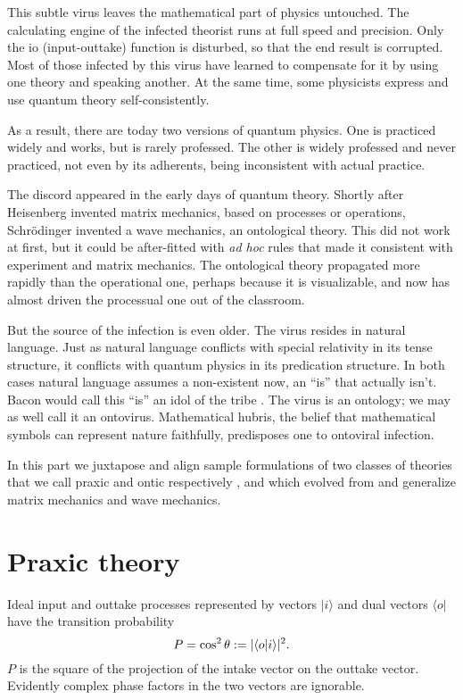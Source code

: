 \documentclass[a4paper,11pt]{article}
\begin{document}
This subtle virus 
leaves the mathematical part of  physics
untouched. 
The calculating engine of the infected theorist 
runs at full speed and precision.
Only the io (input-outtake) function is 
disturbed,
so that the end result is corrupted.
Most of those infected by this virus
have learned to compensate for it
by 
using one theory and 
speaking another.
At the same time,
some physicists 
express and use quantum theory 
self-consistently.

As a result, there are today two 
versions of quantum physics.
One is practiced widely and works,  but  is rarely professed.
The other is widely professed and never practiced,
not even by its adherents,
being inconsistent with actual practice.

The discord appeared in the early days of quantum theory.
Shortly after Heisenberg invented matrix mechanics,
based on 
processes or operations,
Schr\"odinger invented a wave mechanics,
an ontological theory.
This did not work at first, 
but it could be after-fitted
with {\em ad hoc}  rules 
that made it consistent with 
experiment and matrix mechanics.
The ontological theory
propagated more rapidly than the operational one,
perhaps because it is visualizable,
and now  has almost driven the processual 
one out of the classroom.

But the source of the infection is even older.
The virus resides in natural language.
Just as natural language conflicts with special relativity in its tense structure,
it conflicts with quantum physics in its
predication structure.
In both cases natural language assumes a non-existent now,
an ``is''  that actually isn't.
Bacon would call this ``is''  an idol of the tribe \cite{BACON}.
The virus is an ontology;  we may as well call it
an ontovirus.
Mathematical hubris,
the belief that mathematical symbols can
represent nature faithfully,  predisposes  one  to ontoviral infection.

In this part we juxtapose and align sample formulations of two classes 
of theories
that we call praxic and ontic respectively
\cite{FINKELSTEIN1996},
and which evolved from and generalize
matrix mechanics and wave mechanics.

\section{Praxic theory}

{\Large  Ideal  input and outtake
 processes
represented by vectors $|i\rangle$
and dual vectors $\langle o |$ 
have the transition probability 
\begin{equation} 
\label{eq:MALUS}
P= \cos^2 \theta := |\langle o |i\rangle|^2\/.
\end{equation}
}
$P$ is the square of the projection of the intake vector on the outtake vector.
Evidently complex phase factors in the two vectors
are ignorable.
\end{document}
